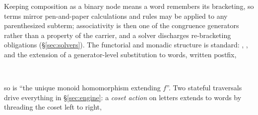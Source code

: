 Keeping composition as a binary node means a word remembers its
bracketing, so terms mirror pen-and-paper calculations and rules may be
applied to any parenthesized subterm; associativity is then one of the
congruence generators rather than a property of the carrier, and a
solver discharges re-bracketing obligations
(\S\ref{sec:solvers}).  The functorial and monadic structure is standard:
, , and the extension of a generator-level
substitution to words, written postfix,

\begin{code}%
\>[0]\AgdaSpace{}%
\AgdaSymbol{:}\AgdaSpace{}%
\AgdaSymbol{(}\AgdaSpace{}%
\AgdaSpace{}%
\AgdaSpace{}%
\AgdaSymbol{)}\AgdaSpace{}%
\AgdaSpace{}%
\AgdaSymbol{(}\AgdaSpace{}%
\AgdaSpace{}%
\AgdaSpace{}%
\AgdaSpace{}%
\AgdaSymbol{)}\<%
\\
\>[0]\AgdaSpace{}%
\AgdaSymbol{=}\AgdaSpace{}%
\<%
\end{code}

\noindent so  is ``the unique monoid homomorphism extending $f$''.  Two
stateful traversals drive everything in \S\ref{sec:engine}: a \emph{coset
action} on letters extends to words by threading the coset left to right,

\begin{code}%
\>[0]\AgdaSpace{}%
\AgdaSymbol{:}\AgdaSpace{}%
\AgdaSymbol{(}\AgdaSpace{}%
\AgdaSpace{}%
\AgdaSpace{}%
\AgdaSpace{}%
\AgdaSpace{}%
\AgdaSpace{}%
\AgdaSpace{}%
\AgdaSymbol{)}\AgdaSpace{}%
\AgdaSpace{}%
\AgdaSymbol{(}\AgdaSpace{}%
\AgdaSpace{}%
\AgdaSpace{}%
\AgdaSpace{}%
\AgdaSpace{}%
\AgdaSpace{}%
\AgdaSpace{}%
\AgdaSpace{}%
\AgdaSymbol{)}\<%
\end{code}
\begin{code}[hide]%
\>[0]\AgdaSpace{}%
\AgdaSymbol{=}\AgdaSpace{}%
\<%
\end{code}


